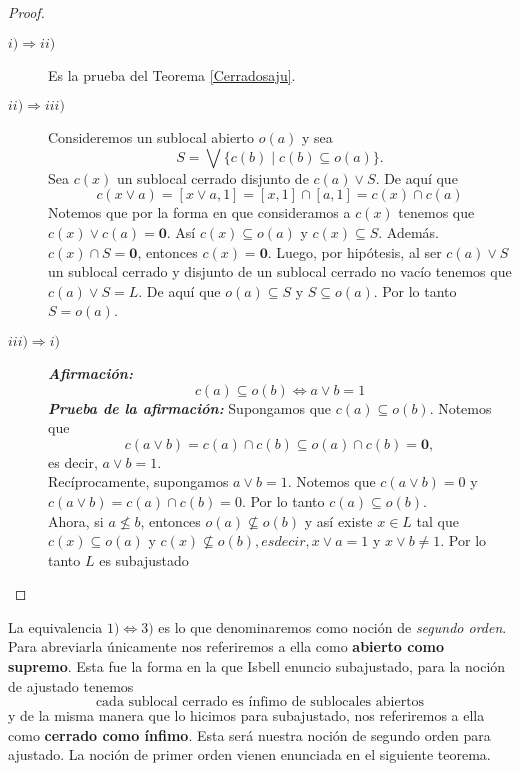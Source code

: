 \begin{proof}
    \begin{description}
        \item[$i)\Rightarrow ii)$] Es la prueba del Teorema \ref{Cerradosaju}.
        \item[$ii)\Rightarrow iii)$] Consideremos un sublocal abierto $o(a)$ y sea 
        \[
        S=\bigvee\{c(b)\mid c(b)\subseteq o(a)\}.
        \]
        Sea $c(x)$ un sublocal cerrado disjunto de $c(a)\vee S$. De aquí que 
        \[
        c(x\vee a)=[x\vee a, 1]=[x, 1]\cap [a, 1]=c(x)\cap c(a)
        \]
        Notemos que por la forma en que consideramos a $c(x)$ tenemos que $c(x)\vee c(a)=\mathbf{0}$. Así $c(x)\subseteq o(a)$ y $c(x)\subseteq S$. Además. $c(x)\cap S=\mathbf{0}$, entonces $c(x)=\mathbf{0}$. Luego, por hipótesis, al ser $c(a)\vee S$ un sublocal cerrado y disjunto de un sublocal cerrado no vacío tenemos que $c(a)\vee S=L$. De aquí que $o(a)\subseteq S$ y $S\subseteq o(a)$. Por lo tanto $S=o(a)$.
        \item[$iii)\Rightarrow i)$] \emph{\textbf{Afirmación:}} 
        \begin{equation}\label{c(a)yo(b)}
            c(a)\subseteq o(b)\Leftrightarrow a\vee b=1
        \end{equation}
        \emph{\textbf{Prueba de la afirmación:}} Supongamos que $c(a)\subseteq o(b)$. Notemos que 
        \[
        c(a\vee b)=c(a)\cap c(b)\subseteq o(a)\cap c(b)=\mathbf{0},
        \]
        es decir, $a\vee b=1$.\\

        \noindent
        Recíprocamente, supongamos $a\vee b=1$. Notemos que $c(a\vee b)=0$ y $c(a\vee b)=c(a)\cap c(b)=0$. Por lo tanto $c(a)\subseteq o(b)$.\\

        Ahora, si $a\nleq b$, entonces $o(a)\nsubseteq o(b)$ y así existe $x\in L$ tal que $c(x)\subseteq o(a)$ y $c(x)\nsubseteq o(b), es decir, x\vee a=1$ y $x\vee b\neq 1$. Por lo tanto $L$ es subajustado
    \end{description}
\end{proof}

La equivalencia $1)\Leftrightarrow 3)$ es lo que denominaremos como noción de \emph{segundo orden}. Para abreviarla únicamente nos referiremos a ella como \textbf{abierto como supremo}. Esta fue la forma en la que Isbell enuncio subajustado, para la noción de ajustado tenemos 
\[
\mbox{cada sublocal cerrado es ínfimo de sublocales abiertos}
\]
y de la misma manera que lo hicimos para subajustado, nos referiremos a ella como \textbf{cerrado como ínfimo}. Esta será nuestra noción de segundo orden para ajustado. La noción de primer orden vienen enunciada en el siguiente teorema.

